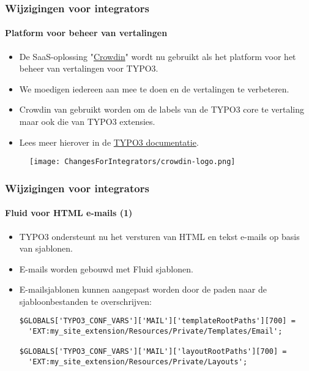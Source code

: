 
\begin{frame}[fragile]
	\frametitle{Wijzigingen voor integrators}
	\framesubtitle{Platform voor beheer van vertalingen}

	\begin{itemize}
		\item De SaaS-oplossing "\href{https://crowdin.com/}{Crowdin}" wordt nu gebruikt als
			het platform voor het beheer van vertalingen voor TYPO3.
		\item We moedigen iedereen aan mee te doen en de vertalingen te verbeteren.
		\item Crowdin van gebruikt worden om de labels van de TYPO3 core te vertaling
			maar ook die van TYPO3 extensies.
		\item Lees meer hierover in de
			\href{https://docs.typo3.org/m/typo3/reference-coreapi/master/en-us/ApiOverview/Internationalization/TranslationServer/Crowdin.html}{TYPO3 documentatie}.
	\end{itemize}

	\begin{figure}
		\texttt{[image: ChangesForIntegrators/crowdin-logo.png]}
	\end{figure}

\end{frame}


\begin{frame}[fragile]
	\frametitle{Wijzigingen voor integrators}
	\framesubtitle{Fluid voor HTML e-mails (1)}

	\lstset{basicstyle=\smaller\ttfamily}

	\begin{itemize}
		\item TYPO3 ondersteunt nu het versturen van HTML en tekst e-mails op basis van sjablonen.
		\item E-mails worden gebouwd met Fluid sjablonen.
		\item E-mailsjablonen kunnen aangepast worden door de paden naar de sjabloonbestanden te overschrijven:

\vspace{-0.4cm}
\begin{lstlisting}
$GLOBALS['TYPO3_CONF_VARS']['MAIL']['templateRootPaths'][700] =
  'EXT:my_site_extension/Resources/Private/Templates/Email';

$GLOBALS['TYPO3_CONF_VARS']['MAIL']['layoutRootPaths'][700] =
  'EXT:my_site_extension/Resources/Private/Layouts';
\end{lstlisting}

	\end{itemize}

\end{frame}

